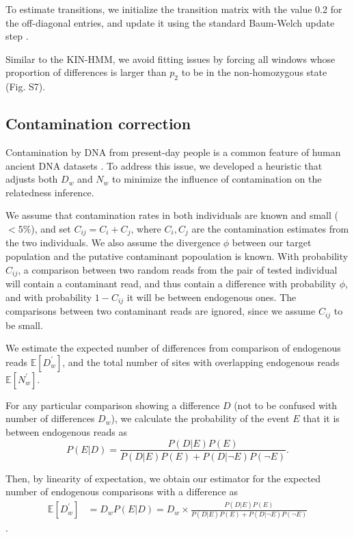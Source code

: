 \documentclass[12pt, letterpaper]{article}
\begin{document}
To estimate transitions, we initialize the transition matrix with the value 0.2 for the off-diagonal entries, and update it using the standard Baum-Welch update step \cite{baum_maximization_1970}.

Similar to the KIN-HMM, we avoid fitting issues by forcing all windows whose proportion of differences is larger than $p_2$ to be in the non-homozygous state (Fig. S7).

\subsection{Contamination correction}\label{contam}
Contamination by DNA from present-day people is a common feature of human ancient DNA datasets \cite{peyregne_present-day_2020}. To address this issue, we developed a heuristic that adjusts both $D_w$ and $N_w$ to minimize the influence of contamination on the relatedness inference.

We assume that contamination rates in both individuals are known and small ($<5\%$), and set $C_{ij} = C_i + C_j$, where $C_i, C_j$ are the contamination estimates from the two individuals. We also assume the divergence $\phi$ between our 
target population and the putative contaminant popoulation is known. With probability $C_{ij}$, a comparison between two random reads from the pair of tested individual will contain a contaminant read, and thus contain a difference with probability $\phi$, and with probability $1 - C_{ij}$ it will be between endogenous ones. The comparisons between two contaminant reads are ignored, since we assume $C_{ij}$ to be small.

We  estimate the expected number of differences from comparison of endogenous reads $\mathbb{E}[D_w^{'}]$, and the total number of sites with overlapping endogenous reads $\mathbb{E}[N_w^{'}]$. 

For any particular comparison showing a difference $D$ (not to be confused with number of differences $D_w$), we calculate the probability of the event $E$ that it is between endogenous reads as 
\begin{equation}
    P(E|D) = \frac{P(D|E)P(E)}{P(D|E)P(E) + P(D| \neg E)P( \neg E)}.
\end{equation}

Then, by linearity of expectation, we obtain our estimator for the expected number of endogenous comparisons with a difference as 
\begin{align}
    \mathbb{E}[D_w^{'}] &= D_{w} P(E|D) = D_{w} \times \frac{P(D|E)P(E)}{P(D|E)P(E) + P(D| \neg E)P( \neg E)}
\end{align}.
\end{document}
